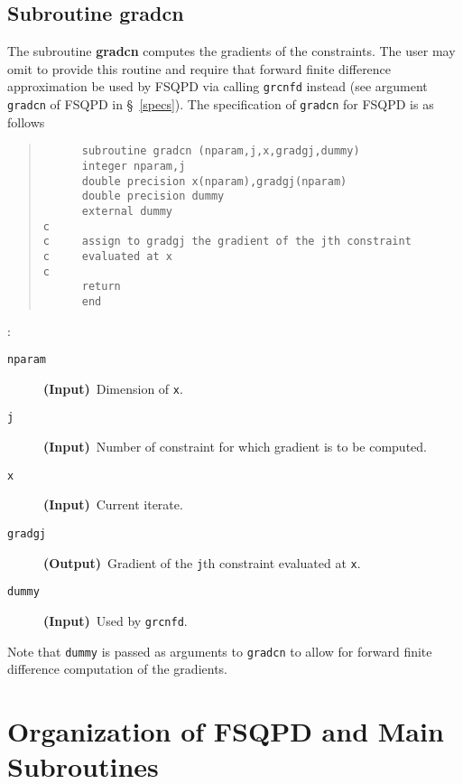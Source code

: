 \subsection{Subroutine gradcn}
\label{subgradcn}
The subroutine {\bf gradcn} computes the gradients of the constraints. 
The user may omit to provide this routine and require that forward 
finite difference approximation be used by FSQPD via 
calling {\tt grcnfd} instead (see argument {\tt gradcn} of 
FSQPD in \S~\ref{specs}).
The specification of {\tt gradcn} for FSQPD is as follows
\begin{quote}
\begin{verbatim}
      subroutine gradcn (nparam,j,x,gradgj,dummy)
      integer nparam,j
      double precision x(nparam),gradgj(nparam)
      double precision dummy
      external dummy
c
c     assign to gradgj the gradient of the jth constraint
c     evaluated at x
c
      return
      end
\end{verbatim}
\end{quote}
:
\begin{description}
\item[\tt nparam]  {\bf (Input)}~Dimension of {\tt x}.
\item[\tt j]     {\bf (Input)}~Number of constraint for which
                               gradient is to be computed. 
\item[\tt x]       {\bf (Input)}~Current iterate.
\item[\tt gradgj]   {\bf (Output)}~Gradient of the {\tt j}th
                    constraint evaluated at {\tt x}.
\item[\tt dummy]  {\bf (Input)}~Used by {\tt grcnfd}.
\end{description}

\noindent Note that {\tt  dummy} is passed as arguments
to {\tt gradcn} to allow for forward finite difference 
computation of the gradients.

\section{Organization of FSQPD and Main Subroutines}
